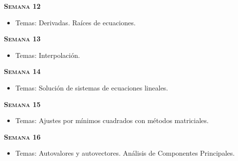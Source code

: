 \documentclass[letterpaper,10pt,onecolumn]{article}
\begin{document}
\noindent\textbf{\textsc{Semana 12}}\\[-0.5cm]
\begin{itemize}
\item Temas: Derivadas. Ra\'ices de ecuaciones. \\[-0.6cm]
\end{itemize}

\noindent\textbf{\textsc{Semana 13}}\\[-0.5cm]
\begin{itemize}
\item Temas: Interpolación. \\[-0.6cm]
\end{itemize}

\noindent\textbf{\textsc{Semana 14}}\\[-0.5cm]
\begin{itemize}
\item Temas: Soluci\'on de sistemas de ecuaciones lineales. 
\\[-0.6cm] 
\end{itemize}


\noindent\textbf{\textsc{Semana 15}}\\[-0.5cm]
\begin{itemize}
\item Temas: Ajustes por m\'inimos cuadrados con m\'etodos matriciales. 
\end{itemize}

\noindent\textbf{\textsc{Semana 16}}\\[-0.5cm]
\begin{itemize}
\item Temas: Autovalores y autovectores. An\'alisis de Componentes Principales. \\[-0.6cm]
\end{itemize}
\end{document}
